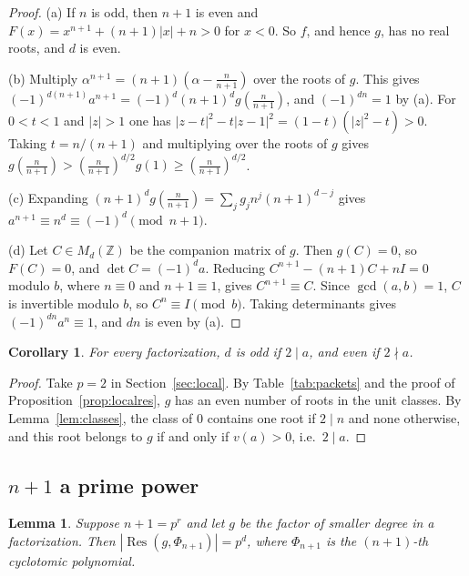 \documentclass[11pt]{amsart}
\newtheorem{lemma}[theorem]{Lemma}
\newtheorem{corollary}[theorem]{Corollary}
\theoremstyle{definition}
\theoremstyle{remark}
\numberwithin{equation}{section}
\newcommand{\Z}{\mathbb{Z}}
\newcommand{\Res}{\operatorname{Res}}
\begin{document}
\begin{proof}
(a) If $n$ is odd, then $n+1$ is even and $F(x)=x^{n+1}+(n+1)|x|+n>0$ for
$x<0$. So $f$, and hence $g$, has no real roots, and $d$ is even.

(b) Multiply $\alpha^{n+1}=(n+1)(\alpha-\tfrac n{n+1})$ over the roots of
$g$. This gives $(-1)^{d(n+1)}a^{n+1}=(-1)^d(n+1)^dg(\tfrac n{n+1})$, and
$(-1)^{dn}=1$ by (a). For $0<t<1$ and $|z|>1$ one has
$|z-t|^2-t|z-1|^2=(1-t)(|z|^2-t)>0$. Taking $t=n/(n+1)$ and multiplying
over the roots of $g$ gives
$g(\tfrac n{n+1})>(\tfrac n{n+1})^{d/2}g(1)\ge(\tfrac n{n+1})^{d/2}$.

(c) Expanding $(n+1)^dg(\tfrac n{n+1})=\sum_jg_jn^j(n+1)^{d-j}$ gives
$a^{n+1}\equiv n^d\equiv(-1)^d\pmod{n+1}$.

(d) Let $C\in M_d(\Z)$ be the companion matrix of $g$. Then $g(C)=0$, so
$F(C)=0$, and $\det C=(-1)^da$. Reducing $C^{n+1}-(n+1)C+nI=0$ modulo $b$,
where $n\equiv0$ and $n+1\equiv1$, gives $C^{n+1}\equiv C$. Since
$\gcd(a,b)=1$, $C$ is invertible modulo $b$, so $C^n\equiv I\pmod b$. Taking
determinants gives $(-1)^{dn}a^n\equiv1$, and $dn$ is even by (a).
\end{proof}

\begin{corollary}\label{cor:r-parity}
For every factorization, $d$ is odd if $2\mid a$, and even if $2\nmid a$.
\end{corollary}

\begin{proof}
Take $p=2$ in Section~\ref{sec:local}. By Table~\ref{tab:packets} and the
proof of Proposition~\ref{prop:localres}, $g$ has an even number of roots
in the unit classes. By Lemma~\ref{lem:classes}, the class of $0$ contains
one root if $2\mid n$ and none otherwise, and this root belongs to $g$ if
and only if $v(a)>0$, i.e.\ $2\mid a$.
\end{proof}

\subsection{\texorpdfstring{$n+1$}{n+1} a prime power}\label{ssec:r-pp}

\begin{lemma}\label{lem:r-cyclo}
Suppose $n+1=p^r$ and let $g$ be the factor of smaller degree in a
factorization. Then $|\Res(g,\Phi_{n+1})|=p^d$, where $\Phi_{n+1}$ is the
$(n+1)$-th cyclotomic polynomial.
\end{lemma}
\end{document}
